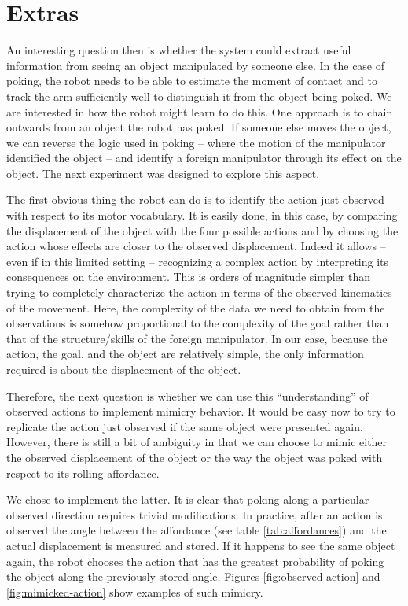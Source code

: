 \section{Extras}

An interesting question then is
whether the system could extract useful information from seeing an
object manipulated by someone else.  In the case of poking, the robot
needs to be able to estimate the moment of contact and to track the arm
sufficiently well to distinguish it from the object being poked.  We
are interested in how the robot might learn to do this.  One approach
is to chain outwards from an object the robot has poked.  If someone
else moves the object, we can reverse the logic used in poking --
where the motion of the manipulator identified the object -- and
identify a foreign manipulator through its effect on the object.
The next experiment was designed to explore this aspect.


The first obvious thing the robot can do is to identify the action
just observed with respect to its motor vocabulary. It is easily done,
in this case, by comparing the displacement of the object with the
four possible actions and by choosing the action whose effects are
closer to the observed displacement.  Indeed it allows -- even if in
this limited setting -- recognizing a complex action by interpreting
its consequences on the environment.  This is orders of magnitude
simpler than trying to completely characterize the action in terms of
the observed kinematics of the movement. Here, the complexity of the
data we need to obtain from the observations is somehow proportional
to the complexity of the goal rather than that of the structure/skills
of the foreign manipulator. In our case, because the action, the goal,
and the object are relatively simple, the only information required is
about the displacement of the object.

Therefore, the next question is whether we can use this
``understanding'' of observed actions to implement mimicry
behavior. It would be easy now to try to replicate the action just
observed if the same object were presented again. However, there is
still a bit of ambiguity in that we can choose to mimic either the
observed displacement of the object or the way the object was poked
with respect to its rolling affordance.
 
We chose to implement the latter. It is clear that poking along a
particular observed direction requires trivial modifications. In
practice, after an action is observed the angle between the affordance
(see table \ref{tab:affordances}) and the actual displacement is
measured and stored. If it happens to see the same object again, the
robot chooses the action that has the greatest probability of poking
the object along the previously stored angle.  Figures
\ref{fig:observed-action} and \ref{fig:mimicked-action} show examples
of such mimicry.


